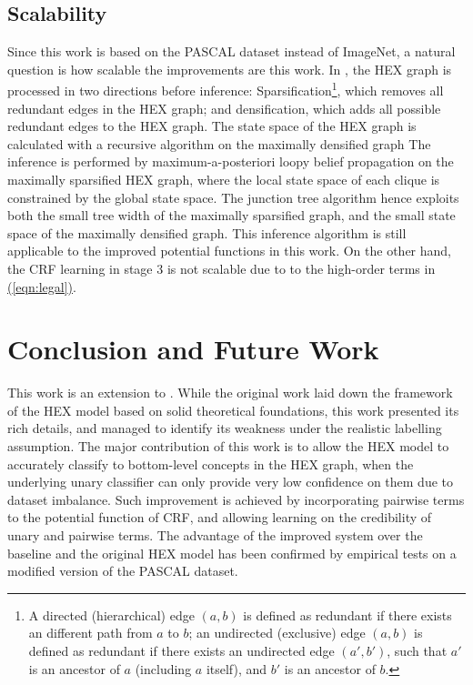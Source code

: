 \documentclass[11pt,a4paper]{book}
\begin{document}
\section{Scalability}
\label{sec:scale}

Since this work is based on the PASCAL dataset instead of ImageNet, a natural question is how scalable the improvements are this work. In \cite{deng2014large}, the HEX graph is processed in two directions before inference: Sparsification\footnote{A directed (hierarchical) edge $(a,b)$ is defined as redundant if there exists an different path from $a$ to $b$; an undirected (exclusive) edge $(a,b)$ is defined as redundant if there exists an undirected edge $(a',b')$, such that $a'$ is an ancestor of $a$ (including $a$ itself), and $b'$ is an ancestor of $b$.}, which removes all redundant edges in the HEX graph; and densification, which adds all possible redundant edges to the HEX graph. The state space of the HEX graph is calculated with a recursive algorithm on the maximally densified graph The inference is performed by maximum-a-posteriori loopy belief propagation on the maximally sparsified HEX graph, where the local state space of each clique is constrained by the global state space. The junction tree algorithm hence exploits both the small tree width of the maximally sparsified graph, and the small state space of the maximally densified graph. This inference algorithm is still applicable to the improved potential functions in this work. On the other hand, the CRF learning in stage 3 is not scalable due to to the high-order terms in \hyperref[eqn:legal]{(\ref{eqn:legal})}.

\chapter{Conclusion and Future Work}

This work is an extension to \cite{deng2014large}. While the original work laid down the framework of the HEX model based on solid theoretical foundations, this work presented its rich details, and managed to identify its weakness under the realistic labelling assumption. The major contribution of this work is to allow the HEX model to accurately classify to bottom-level concepts in the HEX graph, when the underlying unary classifier can only provide very low confidence on them due to dataset imbalance. Such improvement is achieved by incorporating pairwise terms to the potential function of CRF, and allowing learning on the credibility of unary and pairwise terms. The advantage of the improved system over the baseline and the original HEX model has been confirmed by empirical tests on a modified version of the PASCAL dataset.
\end{document}
